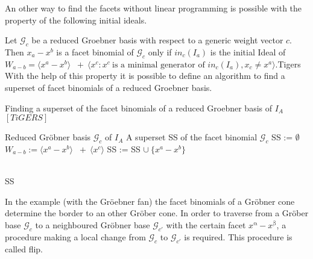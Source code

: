 
An other way to find the facets without linear programming is possible with the property of the following initial ideals.

Let $\mathcal{G}_{c} $ be a reduced Groebner basis with respect to a generic weight vector $c$. Then $x_{a} - x^{b}$ is a facet binomial of $\mathcal{G}_{c}$ only if $in_{c}(I_{a}) $ is the initial Ideal of $W_{a - b} = \langle x^{a}-x^{b}\rangle$
$~+~ \langle x^{c}  : x^{c}~\textrm{is a minimal generator of~} in_{c}(I_{a}), x_{c} \neq x^{a} \rangle$.Tigers
With the help of this property it is possible to define an algorithm to find a superset of facet binomials of a reduced Groebner basis.

\begin{algorithm}
\caption{Finding a superset of the facet binomials
of a reduced Groebner basis of $I_A$ $\left[ TiGERS\right]  $}
\label{ss-alg}
\begin{algorithmic}[1]

\Require
Reduced Gröbner basis $ \mathcal{G}_{c} $ of $I_A$
\Ensure A superset SS of the facet binomial $\mathcal{G}_{c}$
\State SS := $\emptyset$
\State $W_{a - b} := \langle x^{a}-x^{b}\rangle$
$~+~ \langle x^{c} \rangle$ 
\State SS := SS $\cup~ \{x^{a}-x^{b} \}$

\EndIf
\EndFor \\
\Return SS

\end{algorithmic}
\end{algorithm}
 





 



In the example (with the Gröebner fan) the facet binomials of a Gröbner cone determine the border to an other Gröber cone.
In order to traverse from a Gröber base $\mathcal{G}_c$ to a neighboured Gröbner base $\mathcal{G}_{c'}$ with the certain facet $x^{\upalpha}-x^{\upbeta} $, a procedure making a local change from $\mathcal{G}_c$ to $\mathcal{G}_{c'}$ is required.
This procedure is called flip.

\newpage



